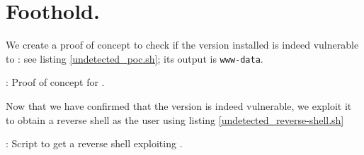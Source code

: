 \section{Foothold.}
\par We create a proof of concept to check if the  version installed is indeed vulnerable to : see listing \ref{undetected_poc.sh}; its output is \texttt{www-data}.
\begin{listing}
  \small
	\caption{: Proof of concept for .}
	\label{undetected_poc.sh}
\end{listing}
\par Now that we have confirmed that the  version is indeed vulnerable, we exploit it to obtain a reverse shell as the  user using listing \ref{undetected_reverse-shell.sh}
\begin{listing}
  \small
	\caption{: Script to get a reverse shell exploiting .}
	\label{undetected_reverse-shell.sh}
\end{listing}
